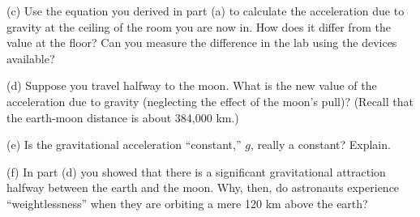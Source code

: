 (c) Use the equation you derived in part (a) to calculate the acceleration due
to gravity at the ceiling of the room you are now in. How does it differ from
the value at the floor? Can you measure the difference in the lab using the
devices available?
\vspace{30mm}

(d) Suppose you travel halfway to the moon. What is the new value of the acceleration due to gravity (neglecting the effect of the moon's pull)? (Recall that the earth-moon distance is about 384,000 km.)
\vspace{30mm}

(e) Is the gravitational acceleration ``constant,'' $g$, really 
a constant? Explain.
\vspace{30mm}

(f) In part (d) you showed that there is a significant gravitational attraction
halfway between the earth and the moon. Why, then, do astronauts experience
``weightlessness'' when they are orbiting a mere 120 km above the earth?


